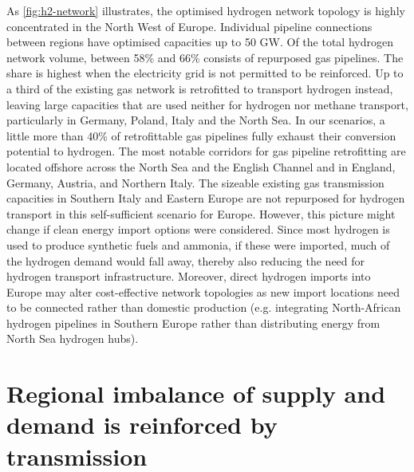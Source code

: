 As \cref{fig:h2-network} illustrates, the optimised hydrogen network topology is
highly concentrated in the North West of Europe. Individual pipeline connections
between regions have optimised capacities up to 50 GW. Of the total hydrogen
network volume, between 58\% and 66\% consists of repurposed gas pipelines. The
share is highest when the electricity grid is not permitted to be reinforced. Up
to a third of the existing gas network is retrofitted to transport hydrogen
instead, leaving large capacities that are used neither for hydrogen nor methane
transport, particularly in Germany, Poland, Italy and the North Sea. In our
scenarios, a little more than 40\% of retrofittable gas pipelines fully exhaust
their conversion potential to hydrogen. The most notable corridors for gas
pipeline retrofitting are located offshore across the North Sea and the English
Channel and in England, Germany, Austria, and Northern Italy. The sizeable
existing gas transmission capacities in Southern Italy and Eastern Europe are
not repurposed for hydrogen transport in this self-sufficient scenario for
Europe. However, this picture might change if clean energy import options were
considered. Since most hydrogen is used to produce synthetic fuels and ammonia,
if these were imported, much of the hydrogen demand would fall away, thereby
also reducing the need for hydrogen transport infrastructure. Moreover, direct
hydrogen imports into Europe may alter cost-effective network topologies as new
import locations need to be connected rather than domestic production (e.g.
integrating North-African hydrogen pipelines in Southern Europe rather than
distributing energy from North Sea hydrogen hubs).



\section*{Regional imbalance of supply and demand is reinforced by transmission}
\label{sec:imbalance}

